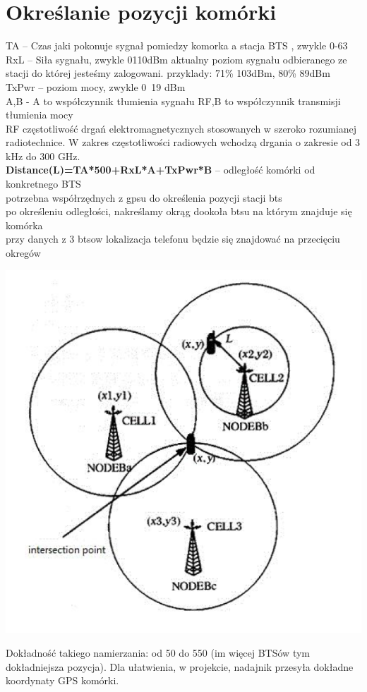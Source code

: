 \documentclass[a4paper,12pt]{article}
\begin{document}
\section{Określanie pozycji komórki}
TA – Czas jaki pokonuje sygnał pomiedzy komorka a stacja BTS , zwykle 0-63\\
RxL – Siła sygnału, zwykle 0110dBm
aktualny poziom sygnału odbieranego ze stacji do której jesteśmy zalogowani.
przyklady: 71\% 103dBm,
80\% 89dBm\\
TxPwr – poziom mocy, zwykle 0~19 dBm\\
A,B - A
to współczynnik tłumienia sygnału RF,B to współczynnik transmisji tłumienia mocy\\
RF częstotliwość
drgań elektromagnetycznych stosowanych w szeroko rozumianej
radiotechnice. W zakres częstotliwości radiowych wchodzą drgania o zakresie od 3 kHz do
300 GHz.\\
\textbf{Distance(L)=TA*500+RxL*A+TxPwr*B} -- odległość komórki od konkretnego
BTS\\
potrzebna współrzędnych z gpsu do określenia pozycji stacji bts\\
po określeniu odległości, nakreślamy okrąg dookoła btsu na którym znajduje się komórka\\
przy danych z 3 btsow lokalizacja telefonu będzie się znajdować na przecięciu okregów\\
\begin{center}
\includegraphics[scale=0.75]{intersection.png}
\end{center}
Dokładność takiego namierzania: od 50 do 550 (im więcej BTSów tym dokładniejsza
pozycja). Dla ułatwienia, w projekcie, nadajnik przesyła dokładne koordynaty GPS komórki.
\newpage
\end{document}
